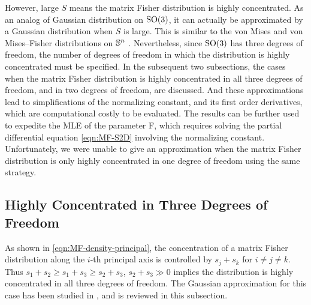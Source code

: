 However, large $S$ means the matrix Fisher distribution is highly concentrated.
As an analog of Gaussian distribution on $\mathrm{SO}(3)$, it can actually be approximated by a Gaussian distribution when $S$ is large.
This is similar to the von Mises and von Mises--Fisher distributions on $\mathbb{S}^n$ \cite{mardia2009directional}.
Nevertheless, since $\mathrm{SO}(3)$ has three degrees of freedom, the number of degrees of freedom in which the distribution is highly concentrated must be specified.
In the subsequent two subsections, the cases when the matrix Fisher distribution is highly concentrated in all three degrees of freedom, and in two degrees of freedom, are discussed.
And these approximations lead to simplifications of the normalizing constant, and its first order derivatives, which are computational costly to be evaluated.
The results can be further used to expedite the MLE of the parameter F, which requires solving the partial differential equation \eqref{eqn:MF-S2D} involving the normalizing constant.
Unfortunately, we were unable to give an approximation when the matrix Fisher distribution is only highly concentrated in one degree of freedom using the same strategy.

\subsection{Highly Concentrated in Three Degrees of Freedom}

As shown in \eqref{eqn:MF-density-principal}, the concentration of a matrix Fisher distribution along the $i$-th principal axis is controlled by $s_j+s_k$ for $i\neq j\neq k$.
Thus $s_1+s_2 \geq s_1+s_3 \geq s_2+s_3$, $s_2+s_3 \gg 0$ implies the distribution is highly concentrated in all three degrees of freedom.
The Gaussian approximation for this case has been studied in \cite{lee2018bayesian-b}, and is reviewed in this subsection.

